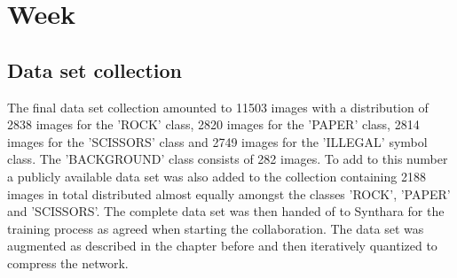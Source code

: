 \chapter{Week}
\section{Data set collection}
The final data set collection amounted to 11503 images with a distribution of 2838 images for the 'ROCK' class, 2820 images for the 'PAPER' class, 2814 images for the 'SCISSORS' class and 2749 images for the 'ILLEGAL' symbol class. The 'BACKGROUND' class consists of 282 images. To add to this number a publicly available data set was also added to the collection containing 2188 images in total distributed almost equally amongst the classes 'ROCK', 'PAPER' and 'SCISSORS'. The complete data set was then handed of to Synthara for the training process as agreed when starting the collaboration. The data set was augmented as described in the chapter before and then iteratively quantized to compress the network.
